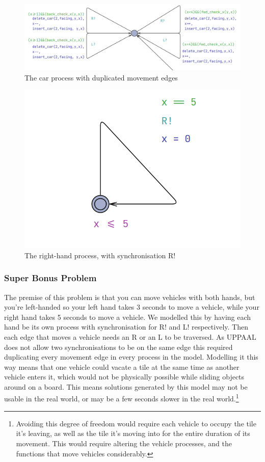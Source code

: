 \documentclass{article}
\begin{document}
\begin{figure}
    \centering
    \includegraphics[width=0.9\linewidth]{images/butterfly.png}
    \caption{The car process with duplicated movement edges}
\end{figure}
\begin{figure}
    \centering
    \includegraphics[width=0.5\linewidth]{images/righty.png}
    \caption{The right-hand process, with synchronisation R!}
\end{figure}

\subsubsection{Super Bonus Problem}
The premise of this problem is that you can move vehicles with both hands, but you're left-handed so your left hand takes 3 seconds to move a vehicle, while your right hand takes 5 seconds to move a vehicle.
We modelled this by having each hand be its own process with synchronisation for R! and L! respectively. Then each edge that moves a vehicle needs an R or an L to be traversed. As UPPAAL does not allow two synchronisations to be on the same edge this required duplicating every movement edge in every process in the model. Modelling it this way means that one vehicle could vacate a tile at the same time as another vehicle enters it, which would not be physically possible while sliding objects around on a board. This means solutions generated by this model may not be usable in the real world, or may be a few seconds slower in the real world.\footnote{Avoiding this degree of freedom would require each vehicle to occupy the tile it's leaving, as well as the tile it's moving into for the entire duration of its movement. This would require altering the vehicle processes, and the functions that move vehicles considerably.}
\end{document}
